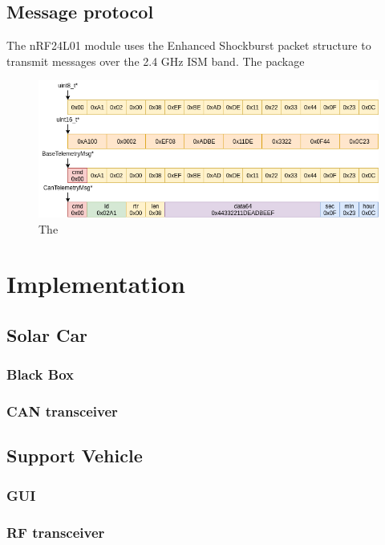 \documentclass[conference]{IEEEtran}
\begin{document}
\subsection{Message protocol}
The nRF24L01 module uses the Enhanced Shockburst packet structure to transmit messages over the 2.4 GHz ISM band. The package 

\begin{figure}
    \centering
    \includegraphics[width=\linewidth]{documentation/images/MessageTypes.png}
    \caption{The }
    \label{fig:my_label}
\end{figure}

\section{Implementation}

\subsection{Solar Car} 
\subsubsection{Black Box} %
\subsubsection{CAN transceiver}
\subsection{Support Vehicle}
\subsubsection{GUI} %
\subsubsection{RF transceiver}
\end{document}
